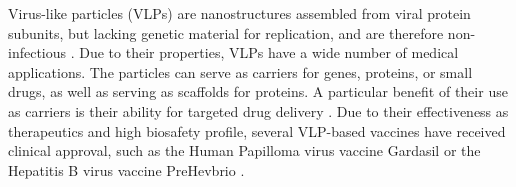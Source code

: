 

Virus-like particles (VLPs) are nanostructures assembled from viral protein subunits, but lacking genetic material for replication, and are therefore non-infectious \cite{vlps_def}. Due to their properties, VLPs have a wide number of medical applications. The particles can serve as carriers for genes, proteins, or small drugs, as well as serving as scaffolds for proteins. A particular benefit of their use as carriers is their ability for targeted drug delivery \cite{vlps_review}. Due to their effectiveness as therapeutics and high biosafety profile, several VLP-based vaccines have received clinical approval, such as the Human Papilloma virus vaccine Gardasil\textsuperscript{\textregistered} or the Hepatitis B virus vaccine PreHevbrio\textsuperscript{\textregistered} \cite{vlps_clinically_approved}.


